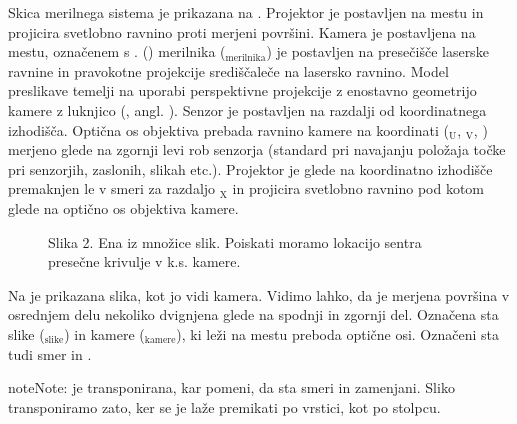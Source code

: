 \documentclass[letterpaper,10pt,english]{sphinxmanual}
\begin{document}
\sphinxAtStartPar
Skica merilnega sistema je prikazana na . Projektor je postavljen na mestu  in projicira svetlobno
ravnino proti merjeni površini. Kamera je postavljena na mestu, označenem s .  () merilnika ($_{\text{merilnika}}$) je postavljen na presečišče laserske ravnine in pravokotne projekcije središčaleče na lasersko ravnino. Model preslikave temelji na uporabi perspektivne projekcije z enostavno
geometrijo kamere z luknjico (, angl. ). Senzor je postavljen na razdalji
 od koordinatnega izhodišča. Optična os objektiva prebada ravnino kamere na koordinati ($_{\text{U}}$, $_{\text{V}}$, )
merjeno glede na zgornji levi rob senzorja (standard pri navajanju položaja točke pri senzorjih, zaslonih,
slikah etc.). Projektor je glede na koordinatno izhodišče premaknjen le v  smeri za razdaljo $_{\text{X}}$ in
projicira svetlobno ravnino pod kotom  glede na optično os objektiva kamere.

\begin{figure}[htbp]
\centering
\capstart

\noindent{}
\caption{Slika 2. Ena iz množice slik. Poiskati moramo lokacijo sentra presečne krivulje v k.s. kamere.}\label{\detokenize{laserskiprofilomer:id2}}\end{figure}

\sphinxAtStartPar
Na  je prikazana slika, kot jo vidi kamera. Vidimo lahko, da je merjena površina v osrednjem delu
nekoliko dvignjena glede na spodnji in zgornji del. Označena sta  slike ($_{\text{slike}}$) in  kamere
($_{\text{kamere}}$), ki leži na mestu preboda optične osi. Označeni sta tudi smer  in .

\begin{sphinxadmonition}{note}{Note:}
\sphinxAtStartPar
{} je transponirana, kar pomeni, da sta smeri  in  zamenjani. Sliko transponiramo zato, ker se je laže premikati po vrstici, kot po stolpcu.
\end{sphinxadmonition}
\end{document}
